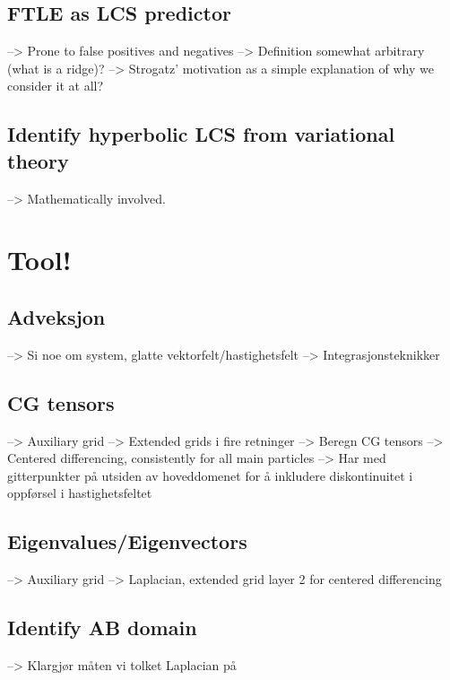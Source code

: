 \section{FTLE as LCS predictor}
--> Prone to false positives and negatives
--> Definition somewhat arbitrary (what is a ridge)?
--> Strogatz' motivation as a simple explanation of why we consider it at all?

\section{Identify hyperbolic LCS from variational theory}
--> Mathematically involved.

\chapter{Tool!}

\section{Adveksjon}
--> Si noe om system, glatte vektorfelt/hastighetsfelt
--> Integrasjonsteknikker

\section{CG tensors}
--> Auxiliary grid
--> Extended grids i fire retninger
--> Beregn CG tensors
--> Centered differencing, consistently for all main particles
--> Har med gitterpunkter på utsiden av hoveddomenet for å inkludere
    diskontinuitet i oppførsel i hastighetsfeltet

\section{Eigenvalues/Eigenvectors}
--> Auxiliary grid
--> Laplacian, extended grid layer 2 for centered differencing

\section{Identify AB domain}
--> Klargjør måten vi tolket Laplacian på

